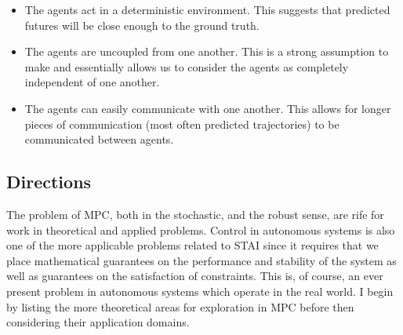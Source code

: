 \documentclass[preprint,11pt]{report}
\begin{document}
\begin{itemize}
	\item The agents act in a deterministic environment. This suggests that predicted futures will
	be close enough to the ground truth.
	\item The agents are uncoupled from one another. This is a strong assumption to make and
	essentially allows us to consider the agents as completely independent of one another. 
	\item The agents can easily communicate with one another. This allows for longer pieces of
	communication (most often predicted trajectories) to be communicated between agents.
\end{itemize}


\subsection{Directions}

The problem of MPC, both in the stochastic, and the robust sense, are rife for work in theoretical
and applied problems. Control in autonomous systems is also one of the more applicable problems
related to STAI since it requires that we place mathematical guarantees on the performance and
stability of the system as well as guarantees on the satisfaction of constraints. This is, of
course, an ever present problem in autonomous systems which operate in the real world. I begin by
listing the more theoretical areas for exploration in MPC before then considering their application
domains.
\end{document}
